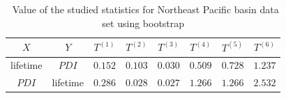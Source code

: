 \begin{table}[H]
	\centering
	\begin{tabular}{cccccccc}
	\toprule
	\toprule
	$X$   & $Y$   & $T^{(1)}$ & $T^{(2)}$ & $T^{(3)}$ & $T^{(4)}$ & $T^{(5)}$ & $T^{(6)}$ \\
	\midrule
	lifetime & $PDI$ & $0.152$ & $0.103$ & $0.030$ & $0.509$ & $0.728$ & $1.237$ \\
	$PDI$ & lifetime & $0.286$ & $0.028$ & $0.027$ & $1.266$ & $1.266$ & $2.532$ \\
	\bottomrule
	\end{tabular}
	\caption{~Value of the studied statistics for Northeast Pacific basin data set using bootstrap}
	\label{tab:base-epac-boot-statistics}
\end{table}

\bigskip

